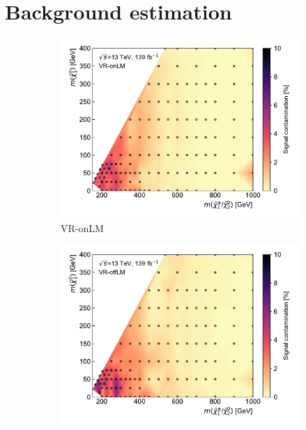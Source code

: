 
\ifpdf
\graphicspath{{chapter-background/Figs/Raster/}{chapter-background/Figs/PDF/}{chapter-background/Figs/}}
\else
\graphicspath{{chapter-background/Figs/Vector/}{chapter-background/Figs/}}
\fi

\section{Background estimation}\label{app:background_estimation}
\begin{figure}[H]
	\centering
	\begin{subfigure}[b]{0.5\linewidth}
		\centering\includegraphics[width=1.0\textwidth]{signal_contamination/plot_VR_onLM}
		\caption{VR-onLM\label{fig:signal_contamination_VRon1}}
	\end{subfigure}\hfill
	\begin{subfigure}[b]{0.5\linewidth}
		\centering\includegraphics[width=1.0\textwidth]{signal_contamination/plot_VR_offLM}

\end{subfigure}
\end{figure}
